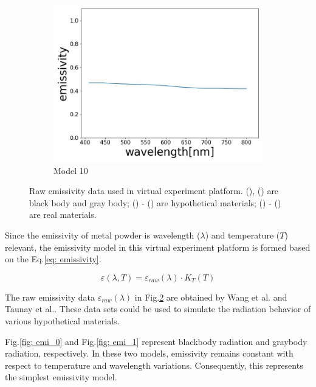 \begin{figure}[htbp]
\begin{subfigure}{0.3\linewidth}
      \includegraphics[width=\linewidth]{figures/emissivity_34.jpg}
      \caption{Model 10}
      \label{fig: emi_34}
    \end{subfigure}
    
    \caption{Raw emissivity data used in virtual experiment platform. (), 
    () are black body and gray body; () - ()
    are hypothetical materials\cite{Wang.2021b}; () - 
    () are real materials\cite{Taunay.2020b}.}
    \label{fig: emi_model}
\end{figure}


Since the emissivity of metal powder is wavelength ($\lambda$) and temperature 
($T$) relevant, the emissivity model in this virtual experiment platform is 
formed based on the Eq.\ref{eq: emissivity}. 


\begin{equation}
  \label{eq: emissivity}
  \varepsilon(\lambda, T) = \varepsilon _{raw}(\lambda) \cdot K_T(T)
\end{equation}


The raw emissivity data $\varepsilon_{raw}(\lambda)$ in Fig.\ref{fig: emi_model}
are obtained by Wang et al.\cite{Wang.2021b} and Taunay et 
al.\cite{Taunay.2020b}. These data sets could be used to simulate the 
radiation behavior of various hypothetical materials.

Fig.\ref{fig: emi_0} and Fig.\ref{fig: emi_1} represent blackbody 
radiation and graybody radiation, respectively. In these two models, 
emissivity remains constant with respect to temperature and 
wavelength variations. Consequently, this represents the simplest 
emissivity model.


